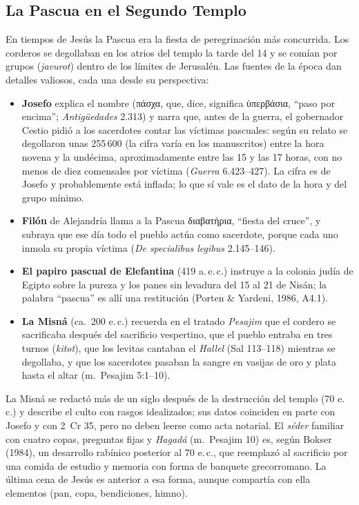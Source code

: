 \documentclass[11pt,letterpaper]{article}
\newcommand{\grc}[1]{\foreignlanguage{ancientgreek}{#1}}
\begin{document}
\subsection{La Pascua en el Segundo Templo}
En tiempos de Jesús la Pascua era la fiesta de peregrinación más concurrida. Los corderos se degollaban en los atrios del templo la tarde del 14 y se comían por grupos (\emph{javurot}) dentro de los límites de Jerusalén. Las fuentes de la época dan detalles valiosos, cada una desde su perspectiva:

\begin{itemize}\setlength{\itemsep}{2pt}
\item \textbf{Josefo} explica el nombre (\grc{πάσχα}, que, dice, significa \grc{ὑπερβάσια}, ``paso por encima''; \emph{Antigüedades} 2.313) y narra que, antes de la guerra, el gobernador Cestio pidió a los sacerdotes contar las víctimas pascuales: según su relato se degollaron unas 255\,600 (la cifra varía en los manuscritos) entre la hora novena y la undécima, aproximadamente entre las 15 y las 17 horas, con no menos de diez comensales por víctima (\emph{Guerra} 6.423--427). La cifra es de Josefo y probablemente está inflada; lo que sí vale es el dato de la hora y del grupo mínimo.
\item \textbf{Filón} de Alejandría llama a la Pascua \grc{διαβατήρια}, ``fiesta del cruce'', y subraya que ese día todo el pueblo actúa como sacerdote, porque cada uno inmola su propia víctima (\emph{De specialibus legibus} 2.145--146).
\item \textbf{El papiro pascual de Elefantina} (419 a.\,e.\,c.) instruye a la colonia judía de Egipto sobre la pureza y los panes sin levadura del 15 al 21 de Nisán; la palabra ``pascua'' es allí una restitución (Porten \& Yardeni, 1986, A4.1).
\item \textbf{La Misná} (ca.\ 200 e.\,c.) recuerda en el tratado \emph{Pesajim} que el cordero se sacrificaba después del sacrificio vespertino, que el pueblo entraba en tres turnos (\emph{kitot}), que los levitas cantaban el \emph{Hallel} (Sal 113--118) mientras se degollaba, y que los sacerdotes pasaban la sangre en vasijas de oro y plata hasta el altar (m.~Pesajim 5:1--10).
\end{itemize}

\begin{nota}
La Misná se redactó más de un siglo después de la destrucción del templo (70 e.\,c.) y describe el culto con rasgos idealizados; sus datos coinciden en parte con Josefo y con 2~Cr 35, pero no deben leerse como acta notarial. El \emph{séder} familiar con cuatro copas, preguntas fijas y \emph{Hagadá} (m.~Pesajim 10) es, según Bokser (1984), un desarrollo rabínico posterior al 70 e.\,c., que reemplazó al sacrificio por una comida de estudio y memoria con forma de banquete grecorromano. La última cena de Jesús es anterior a esa forma, aunque compartía con ella elementos (pan, copa, bendiciones, himno).
\end{nota}
\end{document}
